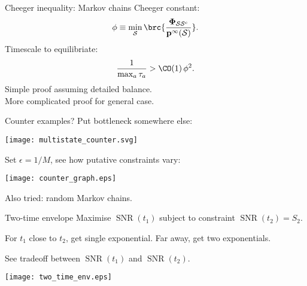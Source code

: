 \documentclass{beamer}%
\DeclareMathOperator{\snr}{SNR}
\newcommand{\pr}{\mathbf{p}}
\newcommand{\eq}{\pr^\infty}
\newcommand{\F}{\boldsymbol{\Phi}}
\newcommand{\CS}{\mathcal{S}}
\newcommand{\comp}{^\mathrm{c}}
\begin{document}

\begin{frame}{Cheeger inequality: Markov chains}
%
 Cheeger constant:
 \begin{equation*}
   \phi \equiv \min_\CS \brc{\frac{\F_{\CS\CS\comp}}{\eq(\CS)}}.
 \end{equation*}
 Timescale to equilibriate:
 \begin{equation*}
   \frac{1}{\max_a\tau_a} > \CO(1)\, \phi^2.
 \end{equation*}
 Simple proof assuming detailed balance. \\
 More complicated proof for general case. 
%
\end{frame}


\begin{frame}{Counter examples?}
%
 Put bottleneck somewhere else:
 \begin{center}
   \texttt{[image: multistate\_counter.svg]}
 \end{center}
 Set $\epsilon = 1/M$, see how putative constraints vary:
 \begin{center}
   \texttt{[image: counter\_graph.eps]}
 \end{center}

 Also tried: random Markov chains.
%
\end{frame}


\begin{frame}{Two-time envelope}
%
 Maximise $\snr(t_1)$ subject to constraint $\snr(t_2)=S_2$.

 \vp For $t_1$ close to $t_2$, get single exponential. Far away, get two exponentials.

 \vp See tradeoff between $\snr(t_1)$ and $\snr(t_2)$.

 \begin{center}
   \texttt{[image: two\_time\_env.eps]}
 \end{center}
%
\end{frame}
\end{document}
